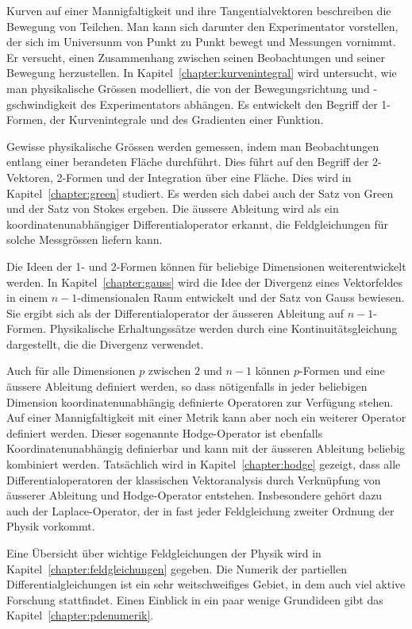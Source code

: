 Kurven auf einer Mannigfaltigkeit und ihre Tangentialvektoren 
beschreiben die Bewegung von Teilchen.
Man kann sich darunter den Experimentator vorstellen, der sich
im Universunm von Punkt zu Punkt bewegt und Messungen vornimmt.
Er versucht, einen Zusammenhang zwischen seinen Beobachtungen
und seiner Bewegung herzustellen.
In Kapitel~\ref{chapter:kurvenintegral} wird untersucht, wie man
physikalische Grössen modelliert, die von der Bewegungsrichtung
und -gschwindigkeit des Experimentators abhängen.
Es entwickelt den Begriff der 1-Formen, der Kurvenintegrale und
des Gradienten einer Funktion.

Gewisse physikalische Grössen werden gemessen, indem man Beobachtungen
entlang einer berandeten Fläche durchführt.
Dies führt auf den Begriff der 2-Vektoren, 2-Formen und der Integration
über eine Fläche.
Dies wird in Kapitel~\ref{chapter:green} studiert.
Es werden sich dabei auch der Satz von Green und der Satz von Stokes
ergeben.
Die äussere Ableitung wird als ein koordinatenunabhängiger
Differentialoperator erkannt, die Feldgleichungen für solche
Messgrössen liefern kann.

Die Ideen der 1- und 2-Formen können für beliebige Dimensionen
weiterentwickelt werden.
In Kapitel~\ref{chapter:gauss} wird die Idee der Divergenz eines
Vektorfeldes in einem $n-1$-dimensionalen Raum entwickelt und der
Satz von Gauss bewiesen.
Sie ergibt sich als der Differentialoperator der äusseren Ableitung
auf $n-1$-Formen.
Physikalische Erhaltungssätze werden durch eine Kontinuitätsgleichung
dargestellt, die die Divergenz verwendet.

Auch für alle Dimensionen $p$ zwischen $2$ und $n-1$ können $p$-Formen und
eine äussere Ableitung definiert werden, so dass nötigenfalls 
in jeder beliebigen Dimension koordinatenunabhängig definierte
Operatoren zur Verfügung stehen.
Auf einer Mannigfaltigkeit mit einer Metrik kann aber noch ein weiterer
Operator definiert werden.
Dieser sogenannte Hodge-Operator ist ebenfalls Koordinatenunabhängig
definierbar und kann mit der äusseren Ableitung beliebig kombiniert
werden.
Tatsächlich wird in Kapitel~\ref{chapter:hodge} gezeigt, dass alle
Differentialoperatoren der klassischen Vektoranalysis durch 
Verknüpfung von äusserer Ableitung und Hodge-Operator entstehen.
Insbesondere gehört dazu auch der Laplace-Operator, der in fast
jeder Feldgleichung zweiter Ordnung der Physik vorkommt.

Eine Übersicht über wichtige Feldgleichungen der Physik wird
in Kapitel~\ref{chapter:feldgleichungen} gegeben.
Die Numerik der partiellen Differentialgleichungen ist ein sehr
weitschweifiges Gebiet, in dem auch viel aktive Forschung stattfindet.
Einen Einblick in ein paar wenige Grundideen gibt das
Kapitel~\ref{chapter:pdenumerik}.

